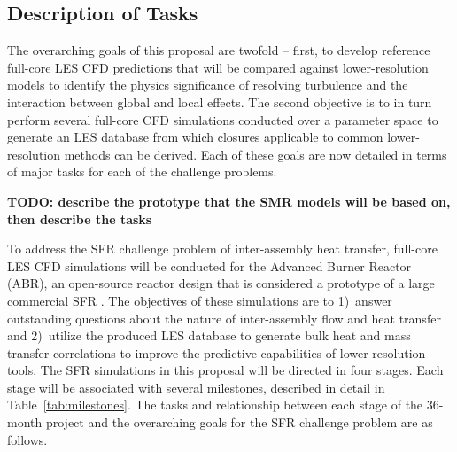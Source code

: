 \documentclass[11pt,letterpaper,english]{article}
\begin{document}
\vspace{-.25in}
\subsection{Description of Tasks}
\vspace{-.2in}


The overarching goals of this proposal are twofold -- first, to develop reference full-core LES CFD predictions that will be compared against lower-resolution models to identify the physics significance of resolving turbulence and the interaction between global and local effects. The second objective is to in turn perform several full-core CFD simulations conducted over a parameter space to generate an LES database from which closures applicable to common lower-resolution methods can be derived. Each of these goals are now detailed in terms of major tasks for each of the challenge problems.

{\bf TODO: describe the prototype that the SMR models will be based on, then describe the tasks}

To address the SFR challenge problem of inter-assembly heat transfer, full-core LES CFD simulations will be conducted for the Advanced Burner Reactor (ABR), an open-source reactor design that is considered a prototype of a large commercial SFR \cite{abr}. The objectives of these simulations are to 1)~answer outstanding questions about the nature of inter-assembly flow and heat transfer and 2)~utilize the produced LES database to generate bulk heat and mass transfer correlations to improve the predictive capabilities of lower-resolution tools. The SFR simulations in this proposal will be directed in four stages. Each stage will be associated with several milestones, described in detail in Table~\ref{tab:milestones}. The tasks and relationship between each stage of the 36-month project and the overarching goals for the SFR challenge problem are as follows.
\end{document}

